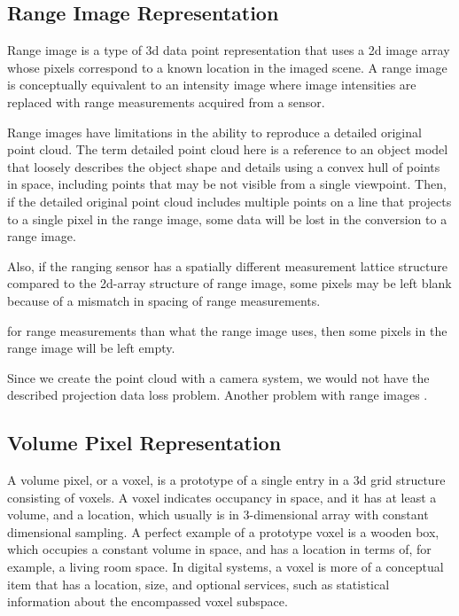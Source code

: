 \documentclass[12pt,a4paper,oneside,pdftex]{report}
\begin{document}

\subsection{Range Image Representation}
\label{subsection:range_image_representation}

Range image is a type of 3d data point representation that uses a 2d image array whose pixels correspond to a known location in the imaged scene. A range image is conceptually equivalent to an intensity image where image intensities are replaced with range measurements acquired from a sensor.

Range images have limitations in the ability to reproduce a detailed original point cloud. The term detailed point cloud here is a reference to an object model that loosely describes the object shape and details using a convex hull of points in space, including points that may be not visible from a single viewpoint. Then, if the detailed original point cloud includes multiple points on a line that projects to a single pixel in the range image, some data will be lost in the conversion to a range image. 

Also, if the ranging sensor has a spatially different measurement lattice structure compared to the 2d-array structure of range image, some pixels may be left blank because of a mismatch in spacing of range measurements.

for range measurements than what the range image uses, then some pixels in the range image will be left empty.

Since we create the point cloud with a camera system, we would not have the described projection data loss problem. Another problem with range images       \cite{Unnikrishnan08}.

\subsection{Volume Pixel Representation}
\label{subsection:volume_pixel_representation}

A volume pixel, or a voxel, is a prototype of a single entry in a 3d grid structure consisting of voxels. A voxel indicates occupancy in space, and it has at least a volume, and a location, which usually is in 3-dimensional array with constant dimensional sampling. A perfect example of a prototype voxel is a wooden box, which occupies a constant volume in space, and has a location in terms of, for example, a living room space. In digital systems, a voxel is more of a conceptual item that has a location, size, and optional services, such as statistical information about the encompassed voxel subspace. 
\end{document}
